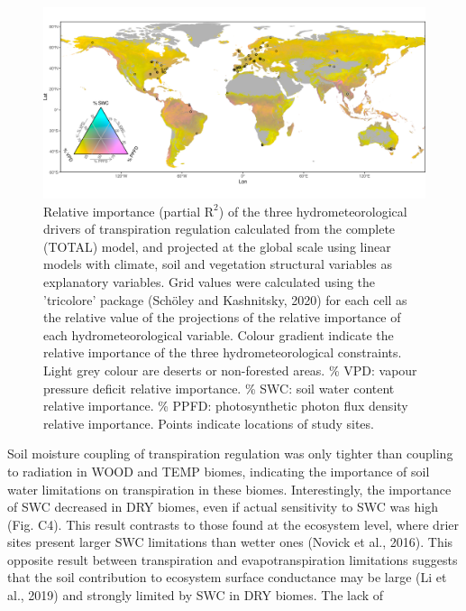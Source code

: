 \documentclass[11pt,twoside]{reedthesis}
\begin{document}
\begin{figure}[hbt!]

{\centering \includegraphics[width=1\linewidth]{figure/CH4/Figure3} 

}

\caption[Relative importance (partial $\text{R}^2$) of the three hydrometeorological drivers of transpiration regulation.]{Relative importance (partial $\text{R}^2$) of the three hydrometeorological drivers of transpiration regulation calculated from the complete (TOTAL) model, and projected at the global scale using linear models with climate, soil and vegetation structural variables as explanatory variables. Grid values were calculated using the 'tricolore' package (Schöley and Kashnitsky, 2020) for each cell as the relative value of the projections of the relative importance of each hydrometeorological variable. Colour gradient indicate the relative importance of the three hydrometeorological constraints. Light grey colour are deserts or non-forested areas.  \% VPD: vapour pressure deficit relative importance. \% SWC: soil water content relative importance. \% PPFD: photosynthetic photon flux density relative importance. Points indicate locations of study sites.}\label{fig:ch4fig3}
\end{figure}
Soil moisture coupling of transpiration regulation was only tighter than
coupling to radiation in WOOD and TEMP biomes, indicating the importance
of soil water limitations on transpiration in these biomes.
Interestingly, the importance of SWC decreased in DRY biomes, even if
actual sensitivity to SWC was high (Fig. C4). This result contrasts to
those found at the ecosystem level, where drier sites present larger SWC
limitations than wetter ones (Novick et al., 2016). This opposite result
between transpiration and evapotranspiration limitations suggests that
the soil contribution to ecosystem surface conductance may be large (Li
et al., 2019) and strongly limited by SWC in DRY biomes. The lack of
\end{document}
